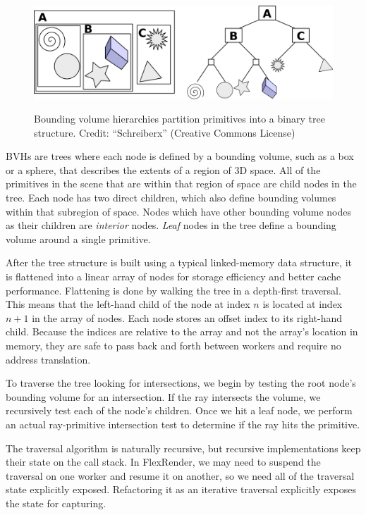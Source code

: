 \documentclass[12pt]{ucthesis}
\newcommand{\captionfonts}{\small\bf\ssp}
\begin{document}
\begin{figure}[h!]
    \centering
    \includegraphics[width=140mm]{figures/bvh.png}
    \captionfonts
    \caption{Bounding volume hierarchies partition primitives into a binary tree structure. Credit: ``Schreiberx'' (Creative Commons License)}
    \label{fig:bvh}
\end{figure}

BVHs are trees where each node is defined by a bounding volume, such as a box
or a sphere, that describes the extents of a region of 3D space. All of the
primitives in the scene that are within that region of space are child nodes
in the tree. Each node has two direct children, which also define bounding
volumes within that subregion of space. Nodes which have other bounding volume
nodes as their children are \emph{interior} nodes. \emph{Leaf} nodes in the tree
define a bounding volume around a single primitive.

After the tree structure is built using a typical linked-memory data structure,
it is flattened into a linear array of nodes for storage efficiency and better
cache performance. Flattening is done by walking the tree in a depth-first
traversal. This means that the left-hand child of the node at index $n$ is
located at index $n + 1$ in the array of nodes. Each node stores an offset
index to its right-hand child. Because the indices are relative to the array
and not the array's location in memory, they are safe to pass back and forth
between workers and require no address translation.

To traverse the tree looking for intersections, we begin by testing the root
node's bounding volume for an intersection. If the ray intersects the volume,
we recursively test each of the node's children. Once we hit a leaf node,
we perform an actual ray-primitive intersection test to determine if the ray
hits the primitive.

The traversal algorithm is naturally recursive, but recursive implementations
keep their state on the call stack. In FlexRender, we may need to suspend the
traversal on one worker and resume it on another, so we need all of the
traversal state explicitly exposed. Refactoring it as an iterative traversal
explicitly exposes the state for capturing.
\end{document}
